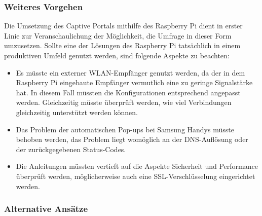 \subsubsection*{Weiteres Vorgehen}
Die Umsetzung des Captive Portals mithilfe des Raspberry Pi dient in erster Linie zur Veranschaulichung der Möglichkeit, die Umfrage in dieser Form umzusetzen. Sollte eine der Lösungen des Raspberry Pi tatsächlich in einem produktiven Umfeld genutzt werden, sind folgende Aspekte zu beachten:
\begin{itemize}
\item Es müsste ein externer WLAN-Empfänger genutzt werden, da der in dem Raspberry Pi eingebaute Empfänger vermutlich eine zu geringe Signalstärke hat. In diesem Fall müssten die Konfigurationen entsprechend angepasst werden. Gleichzeitig müsste überprüft werden, wie viel Verbindungen gleichzeitig unterstützt werden können.
\item Das Problem der automatischen Pop-ups bei Samsung Handys müsste behoben werden, das Problem liegt womöglich an der DNS-Auflösung oder der zurückgegebenen Status-Codes.
\item Die Anleitungen müssten vertieft auf die Aspekte Sicherheit und Performance überprüft werden, möglicherweise auch eine SSL-Verschlüsselung eingerichtet werden.

\end{itemize}

\subsubsection{Alternative Ansätze}

